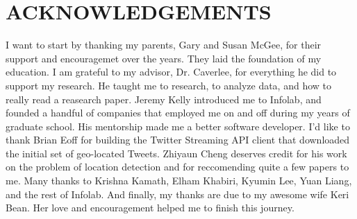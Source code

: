 %
%
%


\chapter*{ACKNOWLEDGEMENTS}

I want to start by thanking my parents, Gary and Susan McGee, for their
support and encouragemet over the years.
%
They laid the foundation of my education.
%
I am grateful to my advisor, Dr. Caverlee, for everything he did to support my
research.
%
He taught me to research, to analyze data, and how to really read a reasearch
paper.
%
Jeremy Kelly introduced me to Infolab, and founded a handful of companies
that employed me on and off during my years of graduate school.
%
His mentorship made me a better software developer.
%
I'd like to thank Brian Eoff for building the Twitter Streaming API client that
downloaded the initial set of geo-located Tweets.
%
Zhiyaun Cheng deserves credit for his work on the problem of location detection
and for reccomending quite a few papers to me.
%
Many thanks to Krishna Kamath, Elham Khabiri, Kyumin Lee, Yuan Liang, and the
rest of Infolab.
%
And finally, my thanks are due to my awesome wife Keri Bean.
%
Her love and encouragement helped me to finish this journey.
\pagebreak{}
